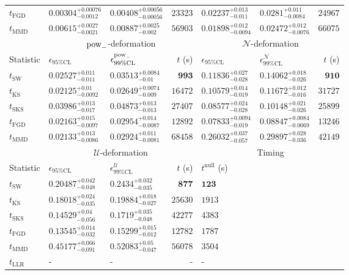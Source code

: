 \begin{tabular}{l|llr|llr}
	$t_{\mathrm{FGD}}$ & ${\mathbf{0.00304_{-0.0012}^{+0.00076}}}$ & ${\mathbf{0.00408_{-0.00056}^{+0.00056}}}$ & $23323$ & $0.02237_{-0.011}^{+0.013}$ & $0.0281_{-0.0084}^{+0.011}$ & $24967$ \\
	$t_{\mathrm{MMD}}$ & $0.00615_{-0.0021}^{+0.0027}$ & $0.00887_{-0.002}^{+0.0025}$ & $56903$ & ${\mathbf{0.01898_{-0.0094}^{+0.012}}}$ & ${\mathbf{0.02472_{-0.0076}^{+0.012}}}$ & $66075$ \\
	\toprule
	\multicolumn{1}{c}{} & \multicolumn{3}{c}{$\rm{pow}_{-}$-deformation} & \multicolumn{3}{c}{$\mathcal{N}$-deformation} \\
	Statistic & $\epsilon_{95\%\mathrm{CL}}$ & $\epsilon^  {\rm{pow}_{-}}_{99\%\mathrm{CL}}$ & $t$ (s) & $\epsilon_{95\%\mathrm{CL}}$ & $\epsilon^    {\mathcal{N}}_{99\%\mathrm{CL}}$ & $t$ (s) \\
	\midrule
	$t_{\mathrm{SW}}$ & $0.02527_{-0.011}^{+0.011}$ & $0.03513_{-0.01}^{+0.0084}$ & ${\mathbf{993}}$ & $0.11836_{-0.028}^{+0.027}$ & $0.14062_{-0.026}^{+0.018}$ & ${\mathbf{910}}$ \\
	$t_{\overline{\mathrm{KS}}}$ & ${\mathbf{0.02125_{-0.0092}^{+0.01}}}$ & ${\mathbf{0.02649_{-0.009}^{+0.0074}}}$ & $16472$ & $0.10579_{-0.019}^{+0.014}$ & $0.11672_{-0.016}^{+0.012}$ & $31727$ \\
	$t_{\mathrm{SKS}}$ & $0.03986_{-0.017}^{+0.013}$ & $0.04873_{-0.013}^{+0.013}$ & $27407$ & $0.08577_{-0.028}^{+0.024}$ & $0.10148_{-0.026}^{+0.021}$ & $25899$ \\
	$t_{\mathrm{FGD}}$ & $0.02163_{-0.0097}^{+0.015}$ & $0.02954_{-0.0087}^{+0.014}$ & $12892$ & ${\mathbf{0.07833_{-0.019}^{+0.0094}}}$ & ${\mathbf{0.08847_{-0.0069}^{+0.0084}}}$ & $13246$ \\
	$t_{\mathrm{MMD}}$ & $0.02133_{-0.0086}^{+0.013}$ & $0.02924_{-0.0081}^{+0.011}$ & $68458$ & $0.26032_{-0.057}^{+0.037}$ & $0.29897_{-0.036}^{+0.028}$ & $42149$ \\
	\toprule
	\multicolumn{1}{c}{} & \multicolumn{3}{c}{$\mathcal{U}$-deformation} & \multicolumn{3}{c}{Timing} \\
	Statistic & $\epsilon_{95\%\mathrm{CL}}$ & $\epsilon^    {\mathcal{U}}_{99\%\mathrm{CL}}$ & $t$ (s) & $t^{\mathrm{null}}$ (s) \\
	\midrule
	$t_{\mathrm{SW}}$ & $0.20487_{-0.048}^{+0.042}$ & $0.2434_{-0.035}^{+0.032}$ & ${\mathbf{877}}$ & ${\mathbf{123}}$ \\
	$t_{\overline{\mathrm{KS}}}$ & $0.18018_{-0.035}^{+0.024}$ & $0.19884_{-0.027}^{+0.018}$ & $25630$ & $1913$ \\
	$t_{\mathrm{SKS}}$ & $0.14529_{-0.056}^{+0.04}$ & $0.1719_{-0.048}^{+0.035}$ & $42277$ & $4383$ \\
	$t_{\mathrm{FGD}}$ & ${\mathbf{0.13545_{-0.032}^{+0.014}}}$ & ${\mathbf{0.15299_{-0.012}^{+0.015}}}$ & $12782$ & $1787$ \\
	$t_{\mathrm{MMD}}$ & $0.45177_{-0.091}^{+0.066}$ & $0.52083_{-0.047}^{+0.05}$ & $56078$ & $3504$ \\
	$t_{\mathrm{LLR}}$ & - & - & - & - \\
	\bottomrule
\end{tabular}